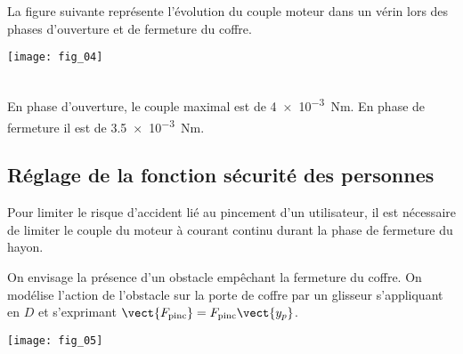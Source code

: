 \ifprof
\else
La figure suivante représente l’évolution du couple moteur dans un vérin lors des phases d’ouverture et de fermeture
du coffre.

\begin{marginfigure}
\texttt{[image: fig\_04]}
\end{marginfigure}
\fi

\ifprof
\begin{corrige}~\\
En phase d'ouverture, le couple maximal est de \SI{4e-3}{Nm}. En phase de fermeture il est de \SI{3,5e-3}{Nm}.
\end{corrige}
\else
\fi



\subsection*{Réglage de la fonction sécurité des personnes}

\ifprof
\else
Pour limiter le risque d’accident lié au pincement d’un utilisateur, il est nécessaire de limiter le couple du moteur
à courant continu durant la phase de fermeture du hayon. %



On envisage la présence d’un obstacle empêchant la fermeture du coffre. On modélise l’action de l’obstacle sur la porte de coffre par un glisseur s’appliquant en $D$ et s’exprimant $\vect{F_{\text{pinc}}} = F_{\text{pinc}}\vect{y_p}$.

\begin{marginfigure}
\texttt{[image: fig\_05]}
\end{marginfigure}



%

